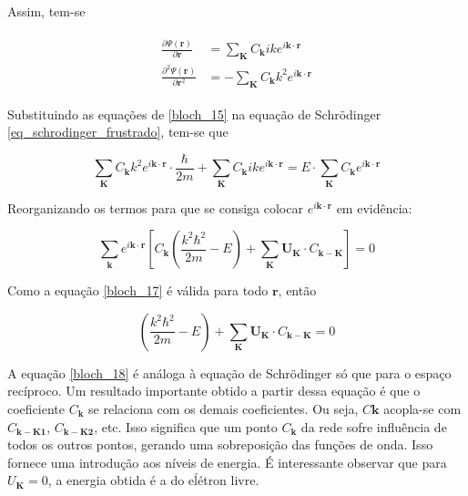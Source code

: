 	\par Assim, tem-se

	\begin{align}\label{bloch_15}
	      \begin{array}{ll}
	        \displaystyle \frac{\partial \Psi(\mathbf{r})}{\partial\mathbf{r}} &= \sum_{\mathbf{K}} C_{\mathbf{k}} ik e^{i\mathbf{k}\cdot \mathbf{r}}\\
	        \displaystyle \frac{\partial^2 \Psi(\mathbf{r})}{\partial\mathbf{r}^2} &= -\sum_{\mathbf{K}} C_{\mathbf{k}} k^2 e^{i\mathbf{k}\cdot \mathbf{r}}	            
	      \end{array}
  \end{align}

	Substituindo as equações de \eqref{bloch_15} na equação de Schrödinger \eqref{eq_schrodinger_frustrado}, tem-se que

	\begin{equation}
		\label{bloch_16}
		\sum_{\mathbf{K}} C_{\mathbf{k}} k^2 e^{i\mathbf{k}\cdot \mathbf{r}} \cdot \frac{\hbar}{2m}
			+ \sum_{\mathbf{K}} C_{\mathbf{k}} ik e^{i\mathbf{k}\cdot \mathbf{r}}
			= E \cdot \sum_{\mathbf{K}} C_{\mathbf{k}} e^{i\mathbf{k}\cdot \mathbf{r}}
	\end{equation}

	Reorganizando os termos para que se consiga colocar $e^{i\mathbf{k}\cdot \mathbf{r}}$ em evidência:

	\begin{equation}
		\label{bloch_17}
		\sum_{\mathbf{k}} e^{i\mathbf{k}\cdot \mathbf{r}}
			\left[ 
				C_\mathbf{k} \left( \frac{k^2 \hbar^2}{2m} - E \right)
				+ \sum_{\mathbf{K}} \mathbf{U}_{\mathbf{K}} \cdot C_{\mathbf{k-K}}
		   \right] = 0
	\end{equation}

	Como a equação \eqref{bloch_17} é válida para todo $\mathbf{r}$, então

	\begin{equation}
		\label{bloch_18}
		\left( \frac{k^2 \hbar^2}{2m} - E \right)
				+ \sum_{\mathbf{K}} \mathbf{U}_{\mathbf{K}} \cdot C_{\mathbf{k-K}} = 0
	\end{equation}

	\par A equação \eqref{bloch_18} é análoga à equação de Schrödinger só que para o espaço recíproco\cite{qm_fis2}. Um resultado importante obtido a partir dessa equação é que o coeficiente $C_{\mathbf{k}}$ se relaciona com os demais coeficientes\cite{qm_fis5}. Ou seja, $C\mathbf{k}$ acopla-se com $C_{\mathbf{k-K1}}$, $C_{\mathbf{k-K2}}$, etc. Isso significa que um ponto $C_{\mathbf{k}}$ da rede sofre influência de todos os outros pontos, gerando uma sobreposição das funções de onda. Isso fornece uma introdução aos níveis de energia\cite{bloch2}. É interessante observar que para $U_{\mathbf{K}} = 0$, a energia obtida é a do eĺétron livre.

